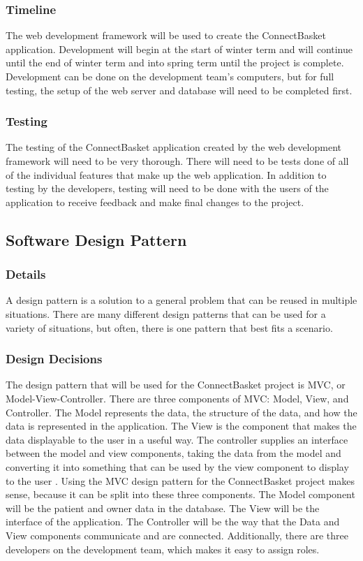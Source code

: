 \documentclass[onecolumn, draftclsnofoot,10pt, compsoc]{IEEEtran}
\begin{document}
\subsubsection{Timeline}
The web development framework will be used to create the ConnectBasket application. Development will begin at the start of winter term and will continue until the end of winter term and into spring term until the project is complete. Development can be done on the development team’s computers, but for full testing, the setup of the web server and database will need to be completed first.


\subsubsection{Testing}
The testing of the ConnectBasket application created by the web development framework will need to be very thorough. There will need to be tests done of all of the individual features that make up the web application. In addition to testing by the developers, testing will need to be done with the users of the application to receive feedback and make final changes to the project.


\subsection{Software Design Pattern}

\subsubsection{Details}
A design pattern is a solution to a general problem that can be reused in multiple situations. There are many different design patterns that can be used for a variety of situations, but often, there is one pattern that best fits a scenario.  


\subsubsection{Design Decisions}
The design pattern that will be used for the ConnectBasket project is MVC, or Model-View-Controller. There are three components of MVC: Model, View, and Controller. The Model represents the data, the structure of the data, and how the data is represented in the application. The View is the component that makes the data displayable to the user in a useful way. The controller supplies an interface between the model and view components, taking the data from the model and converting it into something that can be used by the view component to display to the user \cite{mvc}. Using the MVC design pattern for the ConnectBasket project makes sense, because it can be split into these three components. The Model component will be the patient and owner data in the database. The View will be the interface of the application. The Controller will be the way that the Data and View components communicate and are connected. Additionally, there are three developers on the development team, which makes it easy to assign roles. 
\end{document}
